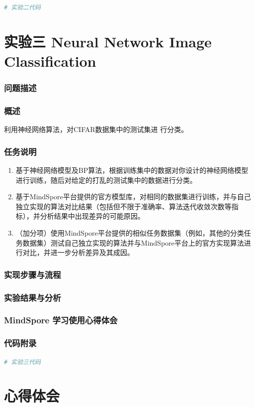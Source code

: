 \documentclass[12pt]{article}
\begin{document}
\begin{lstlisting}[language=Python]
# 实验二代码
\end{lstlisting}

\newpage
\part{\centering 实验三 Neural Network Image Classification}

\section{问题描述}
\section{概述}
利用神经网络算法，对CIFAR数据集中的测试集进
行分类。
\section{任务说明}
\begin{enumerate}%
  \item 基于神经网络模型及BP算法，根据训练集中的数据对你设计的神经网络模型进行训练，随后对给定的打乱的测试集中的数据进行分类。

  \item 基于MindSpore平台提供的官方模型库，对相同的数据集进行训练，并与自己独立实现的算法对比结果（包括但不限于准确率、算法迭代收敛次数等指标），并分析结果中出现差异的可能原因。

  \item （加分项）使用MindSpore平台提供的相似任务数据集（例如，其他的分类任务数据集）测试自己独立实现的算法并与MindSpore平台上的官方实现算法进行对比，并进一步分析差异及其成因。
\end{enumerate}

\section{实现步骤与流程}

\section{实验结果与分析}

\section{MindSpore 学习使用心得体会}

\section{代码附录}



\begin{lstlisting}[language=Python]
# 实验三代码
\end{lstlisting}

\newpage
\part{\centering 心得体会}
\end{document}
